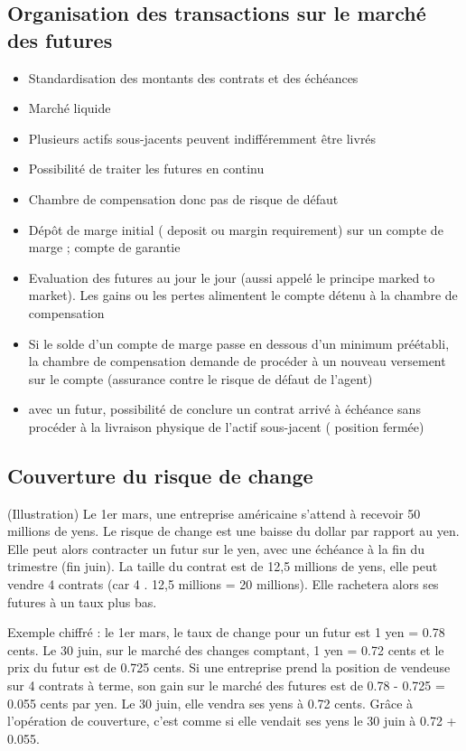 	\subsection{Organisation des transactions sur le marché des futures}
	\begin{itemize}
		\item Standardisation des montants des contrats et des échéances 
		\item Marché liquide 
		\item Plusieurs actifs sous-jacents peuvent indifféremment être livrés 
		\item Possibilité de traiter les futures en continu 
		\item Chambre de compensation donc pas de risque de défaut 
		\item Dépôt de marge initial ( deposit ou margin requirement) sur un compte de marge ; compte de garantie
		\item Evaluation des futures au jour le jour (aussi appelé le principe marked to market). Les gains ou les pertes alimentent le compte détenu à la chambre de compensation
		\item Si le solde d'un compte de marge passe en dessous d'un minimum préétabli, la chambre de compensation demande de procéder à un nouveau versement sur le compte (assurance contre le risque de défaut de l'agent)
		
		\item avec un futur, possibilité de conclure un contrat arrivé à échéance sans procéder à la livraison physique de l'actif sous-jacent ( position fermée)
	\end{itemize}
	
	\subsection{Couverture du risque de change}
	
	(Illustration) Le 1er mars, une entreprise américaine s'attend à recevoir 50 millions de yens. Le risque de change est une baisse du dollar par rapport au yen. Elle peut alors contracter un futur sur le yen, avec une échéance à la fin du trimestre (fin juin). La taille du contrat est de 12,5 millions de yens, elle peut vendre 4 contrats (car 4 . 12,5 millions = 20 millions). Elle rachetera alors ses futures à un taux plus bas.

	Exemple chiffré : le 1er mars, le taux de change pour un futur est 1 yen = 0.78 cents. Le 30 juin, sur le marché des changes comptant, 1 yen = 0.72 cents et le prix du futur est de 0.725 cents. Si une entreprise prend la position de vendeuse sur 4 contrats à terme, son gain sur le marché des futures est de 0.78 - 0.725 = 0.055 cents par yen. Le 30 juin, elle vendra ses yens à 0.72 cents. Grâce à l'opération de couverture, c'est comme si elle vendait ses yens le 30 juin à 0.72 + 0.055.
	
